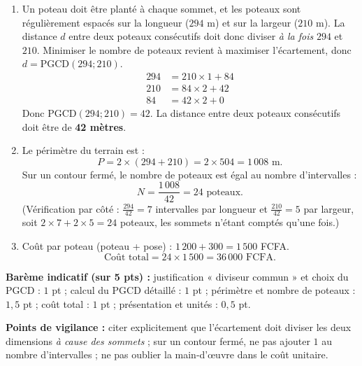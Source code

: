 \documentclass[11pt]{article}
\begin{document}
\begin{corrige}
\begin{enumerate}
    \item Un poteau doit être planté à chaque sommet, et les poteaux sont régulièrement espacés sur la longueur ($294$ m) et sur la largeur ($210$ m). La distance $d$ entre deux poteaux consécutifs doit donc diviser \emph{à la fois} $294$ et $210$. Minimiser le nombre de poteaux revient à maximiser l'écartement, donc $d = \text{PGCD}(294 ; 210)$.
    \begin{align*}
    294 &= 210 \times 1 + 84 \\
    210 &= 84 \times 2 + 42 \\
    84 &= 42 \times 2 + 0
    \end{align*}
    Donc $\text{PGCD}(294 ; 210) = 42$. La distance entre deux poteaux consécutifs doit être de \textbf{42 mètres}.
    \item Le périmètre du terrain est :
    \[ P = 2 \times (294 + 210) = 2 \times 504 = 1\,008 \text{ m}. \]
    Sur un contour fermé, le nombre de poteaux est égal au nombre d'intervalles :
    \[ N = \dfrac{1\,008}{42} = 24 \text{ poteaux.} \]
    (Vérification par côté : $\frac{294}{42} = 7$ intervalles par longueur et $\frac{210}{42} = 5$ par largeur, soit $2 \times 7 + 2 \times 5 = 24$ poteaux, les sommets n'étant comptés qu'une fois.)
    \item Coût par poteau (poteau + pose) : $1\,200 + 300 = 1\,500$ FCFA.
    \[ \text{Coût total} = 24 \times 1\,500 = 36\,000 \text{ FCFA.} \]
\end{enumerate}
\textbf{Barème indicatif (sur 5 pts) :} justification « diviseur commun » et choix du PGCD : $1$ pt ; calcul du PGCD détaillé : $1$ pt ; périmètre et nombre de poteaux : $1{,}5$ pt ; coût total : $1$ pt ; présentation et unités : $0{,}5$ pt.

\textbf{Points de vigilance :} citer explicitement que l'écartement doit diviser les deux dimensions \emph{à cause des sommets} ; sur un contour fermé, ne pas ajouter $1$ au nombre d'intervalles ; ne pas oublier la main-d'œuvre dans le coût unitaire.
\end{corrige}
\end{document}
